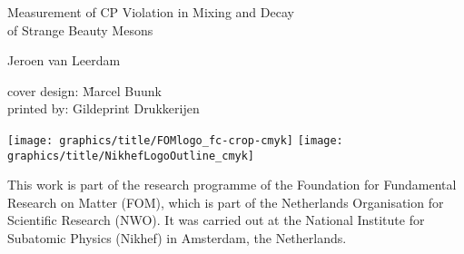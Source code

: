 \thispagestyle{empty}
\begin{center}

  {\Large
  Measurement of CP Violation in Mixing and Decay\\
  of Strange Beauty Mesons}




  {\large
  Jeroen van Leerdam}

\end{center}

\newpage
\thispagestyle{empty}

\begin{tabbing}
  cover design: \hspace{20pt}\=  Marcel Buunk  \\
  printed by:                \>  Gildeprint Drukkerijen
\end{tabbing}


\noindent%
\hspace*{0.05\textwidth}%
\texttt{[image: graphics/title/FOMlogo\_fc-crop-cmyk]}%
%
\texttt{[image: graphics/title/NikhefLogoOutline\_cmyk]}%
\hspace*{0.05\textwidth}\\
\vspace*{-0.02\textwidth}

\noindent This work is part of the research programme of the Foundation for Fundamental Research on Matter (FOM), which is part of the
Netherlands Organisation for Scientific Research (NWO). It was carried out at the National Institute for Subatomic Physics (Nikhef) in
Amsterdam, the Netherlands.

\newpage
\thispagestyle{empty}

